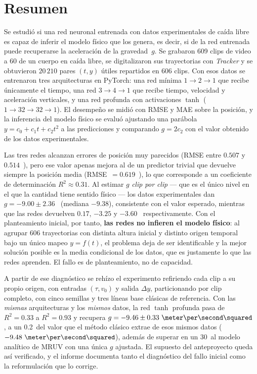 \documentclass[titlepage,11pt]{article}
\providecommand{\num}[1]{\ensuremath{#1}}
\providecommand{\SI}[2]{#1\,#2}
\providecommand{\percent}{\char37\relax}
\begin{document}
\pagestyle{empty}
\setcounter{page}{0}

\section*{Resumen}

Se estudió si una red neuronal entrenada con datos experimentales de caída
libre es capaz de inferir el modelo físico que los genera, es decir, si de la
red entrenada puede recuperarse la aceleración de la gravedad~$g$. Se grabaron
609 clips de video a \unit{60}{\hertz} de un cuerpo en caída libre, se
digitalizaron sus trayectorias con \emph{Tracker} y se obtuvieron
\num{20\,210} pares $(t,y)$ útiles repartidos en 606 clips. Con esos datos se
entrenaron tres arquitecturas en PyTorch: una red mínima $1\to2\to1$ que
recibe únicamente el tiempo, una red $3\to4\to1$ que recibe tiempo, velocidad
y aceleración verticales, y una red profunda con activaciones $\tanh$
($1\to32\to32\to1$). El desempeño se midió con RMSE y MAE sobre la posición, y
la inferencia del modelo físico se evaluó ajustando una parábola
$y=c_0+c_1t+c_2t^2$ a las predicciones y comparando $g=2c_2$ con el valor
obtenido de los datos experimentales.

Las tres redes alcanzan errores de posición muy parecidos
(RMSE entre \num{0.507} y \num{0.514}~\meter), pero ese valor apenas mejora al
de un predictor trivial que devuelve siempre la posición media
(RMSE~$=\num{0.619}$~\meter), lo que corresponde a un coeficiente de
determinación $R^2\approx\num{0.31}$. Al estimar $g$ \emph{clip por clip} ---
que es el único nivel en el que la cantidad tiene sentido físico --- los datos
experimentales dan $g=\num{-9.00}\pm\num{2.36}$~\meter\per\second\squared{}
(mediana \num{-9.38}), consistente con el valor esperado, mientras que las
redes devuelven $\num{0.17}$, $\num{-3.25}$ y
$\num{-3.60}$~\meter\per\second\squared{} respectivamente. Con el planteamiento
inicial, por tanto, \textbf{las redes no infieren el modelo físico}: al agrupar
606 trayectorias con distinta altura inicial y distinto origen temporal bajo un
único mapeo $y=f(t)$, el problema deja de ser identificable y la mejor solución
posible es la media condicional de los datos, que es justamente lo que las
redes aprenden. El fallo es de planteamiento, no de capacidad.

A partir de ese diagnóstico se rehízo el experimento refiriendo cada clip a su
propio origen, con entradas $(\tau,v_0)$ y salida $\Delta y$, particionando por
clip completo, con cinco semillas y tres líneas base clásicas de referencia.
Con las \emph{mismas} arquitecturas y los \emph{mismos} datos, la red $\tanh$
profunda pasa de $R^2=\num{0.33}$ a $R^2=\num{0.93}$ y recupera
$g=\num{-9.46}\pm\num{0.33}~\meter\per\second\squared$, a un
\SI{0.2}{\percent} del valor que el método clásico extrae de esos mismos datos
($\num{-9.48}~\meter\per\second\squared$), además de superar en un
\SI{30}{\percent} al modelo analítico de MRUV con una única $g$ ajustada. El
supuesto del anteproyecto queda así verificado, y el informe documenta tanto el
diagnóstico del fallo inicial como la reformulación que lo corrige.
\end{document}
